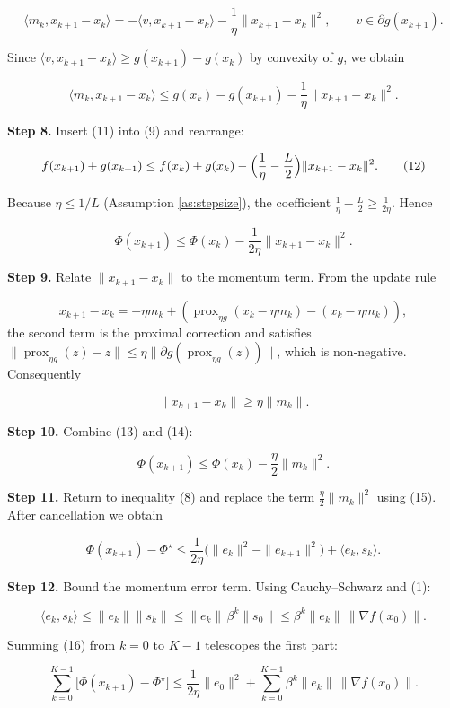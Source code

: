 \documentclass{article}
\begin{document}
\[
\langle m_k, x_{k+1}-x_k\rangle = -\langle v, x_{k+1}-x_k\rangle-\frac{1}{\eta}\|x_{k+1}-x_k\|^2,
\qquad v\in\partial g(x_{k+1}).
\tag{10}
\]

Since $\langle v, x_{k+1}-x_k\rangle\ge g(x_{k+1})-g(x_k)$ by convexity of $g$, we obtain  

\[
\langle m_k, x_{k+1}-x_k\rangle\le g(x_k)-g(x_{k+1})-\frac{1}{\eta}\|x_{k+1}-x_k\|^2 .
\tag{11}
\]

\noindent\textbf{Step 8.}  Insert (11) into (9) and rearrange:

\[
f(x_{k+1})+g(x_{k+1})
\le f(x_k)+g(x_k)-\Bigl(\frac{1}{\eta}-\frac{L}{2}\Bigr)\|x_{k+1}-x_k\|^2 .
\tag{12}
\]

Because $\eta\le 1/L$ (Assumption \ref{as:stepsize}), the coefficient $\frac{1}{\eta}-\frac{L}{2}\ge\frac{1}{2\eta}$. Hence

\[
\Phi(x_{k+1})\le \Phi(x_k)-\frac{1}{2\eta}\|x_{k+1}-x_k\|^2 .
\tag{13}
\]

\noindent\textbf{Step 9.}  Relate $\|x_{k+1}-x_k\|$ to the momentum term.  From the update rule  

\[
x_{k+1}-x_k = -\eta m_k + ( \operatorname{prox}_{\eta g}(x_k-\eta m_k)- (x_k-\eta m_k)),
\]
the second term is the proximal correction and satisfies  
$\|\operatorname{prox}_{\eta g}(z)-z\|\le \eta\| \partial g(\operatorname{prox}_{\eta g}(z))\|$, which is non‑negative.  Consequently  

\[
\|x_{k+1}-x_k\|\ge \eta\|m_k\| .
\tag{14}
\]

\noindent\textbf{Step 10.}  Combine (13) and (14):

\[
\Phi(x_{k+1})\le \Phi(x_k)-\frac{\eta}{2}\|m_k\|^2 .
\tag{15}
\]

\noindent\textbf{Step 11.}  Return to inequality (8) and replace the term $\frac{\eta}{2}\|m_k\|^2$ using (15).  After cancellation we obtain

\[
\Phi(x_{k+1})-\Phi^\star
\le \frac{1}{2\eta}\bigl(\|e_k\|^2-\|e_{k+1}\|^2\bigr)+\langle e_k,s_k\rangle .
\tag{16}
\]

\noindent\textbf{Step 12.}  Bound the momentum error term.  Using Cauchy–Schwarz and (1):

\[
\langle e_k,s_k\rangle\le \|e_k\|\|s_k\|
\le \|e_k\|\,\beta^{k}\|s_0\|
\le \beta^{k}\|e_k\|\,\|\nabla f(x_0)\|.
\tag{17}
\]

Summing (16) from $k=0$ to $K-1$ telescopes the first part:

\[
\sum_{k=0}^{K-1}\bigl[\Phi(x_{k+1})-\Phi^\star\bigr]
\le \frac{1}{2\eta}\|e_0\|^2+\sum_{k=0}^{K-1}\beta^{k}\|e_k\|\,\|\nabla f(x_0)\|.
\tag{18}
\]
\end{document}
